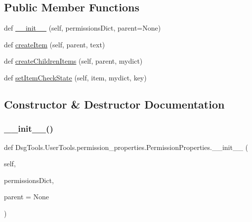 \subsection*{Public Member Functions}
\begin{DoxyCompactItemize}
\item 
def \mbox{\hyperlink{class_dsg_tools_1_1_user_tools_1_1permission__properties_1_1_permission_properties_a11e7a234b510c4d20bdeee6a3e63d891}{\+\_\+\+\_\+init\+\_\+\+\_\+}} (self, permissions\+Dict, parent=None)
\item 
def \mbox{\hyperlink{class_dsg_tools_1_1_user_tools_1_1permission__properties_1_1_permission_properties_ab5156b62b30098783bef4e10891632ff}{create\+Item}} (self, parent, text)
\item 
def \mbox{\hyperlink{class_dsg_tools_1_1_user_tools_1_1permission__properties_1_1_permission_properties_a6eb2030f5764ee9d607271c96e5ad2a5}{create\+Children\+Items}} (self, parent, mydict)
\item 
def \mbox{\hyperlink{class_dsg_tools_1_1_user_tools_1_1permission__properties_1_1_permission_properties_af518c4af5cbbd1ebe029ba00dd896659}{set\+Item\+Check\+State}} (self, item, mydict, key)
\end{DoxyCompactItemize}


\subsection{Constructor \& Destructor Documentation}
\mbox{\label{class_dsg_tools_1_1_user_tools_1_1permission__properties_1_1_permission_properties_a11e7a234b510c4d20bdeee6a3e63d891}} 
\subsubsection{\texorpdfstring{\+\_\+\+\_\+init\+\_\+\+\_\+()}{\_\_init\_\_()}}
{\footnotesize\ttfamily def Dsg\+Tools.\+User\+Tools.\+permission\+\_\+properties.\+Permission\+Properties.\+\_\+\+\_\+init\+\_\+\+\_\+ (\begin{DoxyParamCaption}\item[{}]{self,  }\item[{}]{permissions\+Dict,  }\item[{}]{parent = {\ttfamily None} }\end{DoxyParamCaption})}


